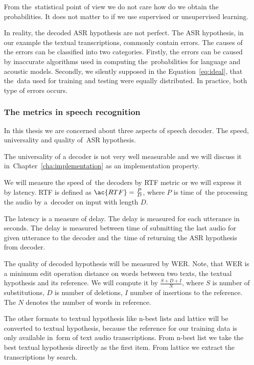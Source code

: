 From the~statistical point of view we do not care how do we obtain the probabilities.
It does not matter to if we use supervised or unsupervised learning. 

In reality, the decoded ASR hypothesis are not perfect. The ASR hypothesis, in our example the textual transcriptions, 
commonly contain errors. The causes of the errors can be classified into two categories. 
Firstly, the errors can be caused by inaccurate algorithms used in computing 
the~probabilities for language and acoustic models. Secondly, we silently supposed in the Equation~\ref{eq:ideal}, 
that the~data used for training and testing were equally distributed. 
In practice, both type of errors occurs.

\subsubsection*{The metrics in speech recognition}
\label{sub:the_metrics_in_speech_recognition}
In this thesis we are concerned about three aspects of speech decoder.
The speed, universality and quality of~\ac{ASR} hypothesis.

The universality of a decoder is not very well measurable and we will discuss it 
in~Chapter~\ref{cha:implementation} as an implementation property.

We will measure the speed of~the decoders by \acl{RTF} metric or we will express it by latency.
\ac{RTF} is defined as $\ac{RTF} = \frac{P}{D}$, where $P$ is time of~the processing the audio by a~decoder on input with length $D$. 

The latency is a measure of delay. The delay is measured for each utterance in seconds. 
The delay is measured between time of submitting the last audio for given utterance to the decoder and 
the~time of returning the \ac{ASR} hypothesis from decoder.

The quality of decoded hypothesis will be measured by \ac{WER}.
Note, that \ac{WER} is a minimum edit operation distance on words between two texts, the textual hypothesis
and its reference.
We will compute it by $\frac{S+D+I}{N}$, where $S$ is number of substitutions,
$D$ is number of deletions, $I$ number of insertions to the reference. 
The $N$ denotes the number of words in reference.

The other formats to textual hypothesis like n-best lists and lattice
will be converted to textual hypothesis, because the reference for our training data is only available  
in~form of text audio transcriptions.
From n-best list we take the best textual hypothesis directly as the first item. From lattice
we extract the transcriptions by search.  

